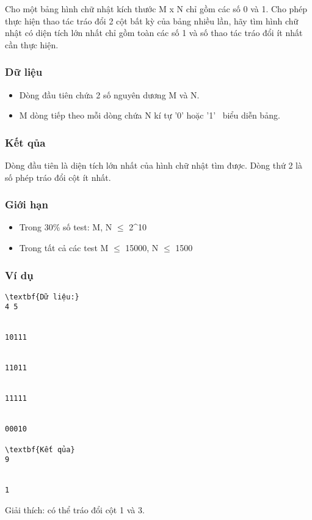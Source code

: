 



   Cho một bảng hình chữ nhật kích thước M x N chỉ gồm các số 0 và 1. Cho phép thực hiện thao tác tráo đổi 2 cột bất kỳ của bảng nhiều lần, hãy tìm hình chữ nhật có diện tích lớn nhất chỉ gồm toàn các số 1 và số thao tác tráo đổi ít nhất cần thực hiện.  

\subsubsection{   Dữ liệu  }
\begin{itemize}
	\item     Dòng đầu tiên chứa 2 số nguyên dương M và N.   
	\item     M dòng tiếp theo mỗi dòng chứa N kí tự '0' hoặc '1'  biểu diễn bảng.   
\end{itemize}

\subsubsection{   Kết qủa  }

   Dòng đầu tiên là diện tích lớn nhất của hình chữ nhật tìm được. Dòng thứ 2 là số phép tráo đổi cột ít nhất.  

\subsubsection{   Giới hạn  }
\begin{itemize}
	\item     Trong 30\% số test: M, N  $\le$  2^10   
	\item     Trong tất cả các test M  $\le$  15000, N  $\le$  1500   
\end{itemize}

\subsubsection{   Ví dụ  }
\begin{verbatim}
\textbf{Dữ liệu:}
4 5


10111


11011


11111


00010

\textbf{Kết qủa}
9


1
\end{verbatim}

   Giải thích: có thể tráo đổi cột 1 và 3.  
